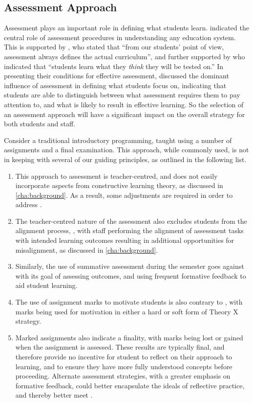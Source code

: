 \subsection{Assessment Approach} %
\label{sub:assessment_approach}

Assessment plays an important role in defining what students learn. \citet{Rowntree:1977} indicated the central role of assessment procedures in understanding any education system. This is supported by \citet{Ramsden:1992}, who stated that ``from our students' point of view, assessment always defines the actual curriculum'', and further supported by \citet{Biggs:2007} who indicated that ``students learn what they \emph{think} they will be tested on.'' In presenting their conditions for effective assessment, \citet{Gibbs:2004} discussed the dominant influence of assessment in defining what students focus on, indicating that students are able to distinguish between what assessment requires them to pay attention to, and what is likely to result in effective learning. So the selection of an assessment approach will have a significant impact on the overall strategy for both students and staff. 

Consider a traditional introductory programming, taught using a number of assignments and a final examination. This approach, while commonly used, is not in keeping with several of our guiding principles, as outlined in the following list. 

\begin{enumerate}
	\item This approach to assessment is teacher-centred, and does not easily incorporate aspects from constructive learning theory, as discussed in \cref{cha:background}.  As a result, some adjustments are required in order to address .
	\item The teacher-centred nature of the assessment also excludes students from the alignment process, , with staff performing the alignment of assessment tasks with intended learning outcomes resulting in additional opportunities for misalignment, as discussed in \cref{cha:background}. 
	\item Similarly, the use of summative assessment during the semester goes against  with its goal of assessing outcomes, and using frequent formative feedback to aid student learning.
	\item The use of assignment marks to motivate students is also contrary to , with marks being used for motivation in either a hard or soft form of Theory X strategy.
	\item Marked assignments also indicate a finality, with marks being lost or gained when the assignment is assessed. These results are typically final, and therefore provide no incentive for student to reflect on their approach to learning, and to ensure they have more fully understood concepts before proceeding. Alternate assessment strategies, with a greater emphasis on formative feedback, could better encapsulate the ideals of reflective practice, and thereby better meet .
\end{enumerate}

